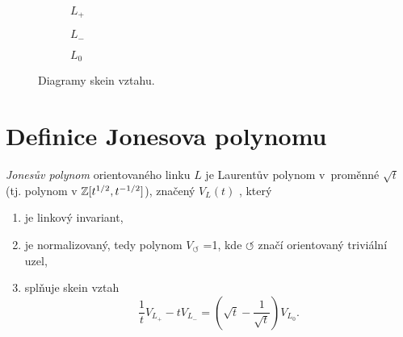 \begin{figure}[h]  
\centering 
\begin{subfigure}[t]{0.4\linewidth}\centering
{} 
\caption{$L_+$} 
\end{subfigure}
\begin{subfigure}[t]{0.4\linewidth}\centering
{}  
\caption{$L_-$}
\end{subfigure}
\begin{subfigure}[t]{0.4\linewidth}\centering
{}
\caption{$L_0$}
\end{subfigure}
\caption{Diagramy skein vztahu.} \label{skein}
\end{figure}

\section{Definice Jonesova polynomu}

\begin{definice}\label{def01:1}
\emph{Jonesův polynom} orientovaného linku $L$ je Laurentův polynom v~proměnné $\sqrt{t}$ (tj. polynom v $\mathbb{Z}[t^{1/2}, t^{-1/2}]$), značený $V_L(t)$ , který
\begin{enumerate}
\item
je linkový invariant,
\item 
  je normalizovaný, tedy polynom  $V_{\pmb{\circlearrowleft}}$ =1, kde ${\pmb{\circlearrowleft}}$ značí orientovaný triviální uzel,
\item  
splňuje skein vztah 
\begin{equation} \label{skein}
\frac{1}{t} V_{L_+} - t V_{L_-} = \left( \sqrt{t}  - \frac{1}{\sqrt{t}}\right) V_{L_0}.
\end{equation}
\end{enumerate}
\end{definice}

